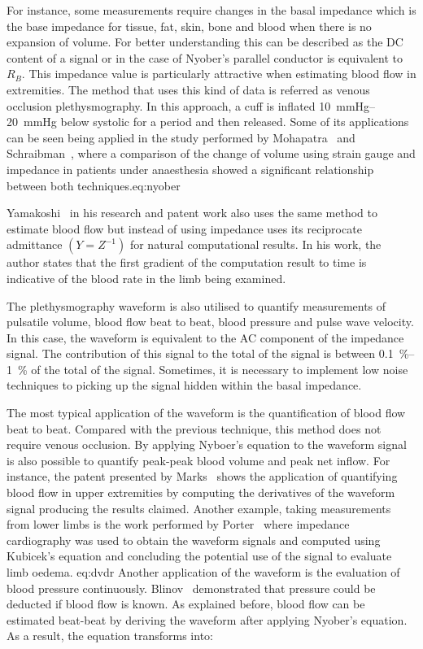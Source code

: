 For instance, some measurements require changes in the basal impedance which is the base impedance for tissue, fat, skin, bone and blood when there is no expansion of volume. For better understanding this can be described as the DC content of a signal or in the case of Nyober's parallel conductor is equivalent to $R_B$. This impedance value is particularly attractive when estimating blood flow in extremities. The method that uses this kind of data is referred as venous occlusion plethysmography. In this approach, a cuff is inflated \SIrange{10}{20}{\mmHg} below systolic for a period and then released. Some of its applications can be seen being applied in the study performed by Mohapatra~\cite{mohapatra1979measurement} and Schraibman~\cite{schraibman1975comparison}, where a comparison of the change of volume using strain gauge and impedance in patients under anaesthesia showed a significant relationship between both techniques.{eq:nyober}

Yamakoshi~\cite{shimazu1982evaluation,yamakoshi1980limb,yamakoshi1978admittance}  in his research and patent work also uses the same method to estimate blood flow but instead of using impedance uses its reciprocate admittance $(Y=Z^{-1})$ for natural computational results. In his work, the author states that the first gradient of the computation result to time is indicative of the blood rate in the limb being examined.
 
The plethysmography waveform is also utilised to quantify measurements of pulsatile volume, blood flow beat to beat, blood pressure and pulse wave velocity. In this case, the waveform is equivalent to the AC component of the impedance signal. The contribution of this signal to the total of the signal is between \SIrange{0.1}{1}{\percent} of the total of the signal. Sometimes, it is necessary to implement low noise techniques to picking up the signal hidden within the basal impedance. 

The most typical application of the waveform is the quantification of blood flow beat to beat. Compared with the previous technique, this method does not require venous occlusion. By applying Nyboer's equation to the waveform signal is also possible to quantify peak-peak blood volume and peak net inflow. For instance, the patent presented by Marks~\cite{marks1985computer} shows the application of quantifying blood flow in upper extremities by computing the derivatives of the waveform signal producing the results claimed. Another example, taking measurements from lower limbs is the work performed by Porter~\cite{porter1985measurement} where impedance cardiography was used to obtain the waveform signals and computed using Kubicek's equation and concluding the potential use of the signal to evaluate limb oedema. 
{eq:dvdr}
Another application of the waveform is the evaluation of blood pressure continuously. Blinov~\cite{blinov1997plethysmographic} demonstrated that pressure could be deducted if blood flow is known. As explained before, blood flow can be estimated beat-beat by deriving the waveform after applying Nyober's equation. As a result, the equation transforms into:

